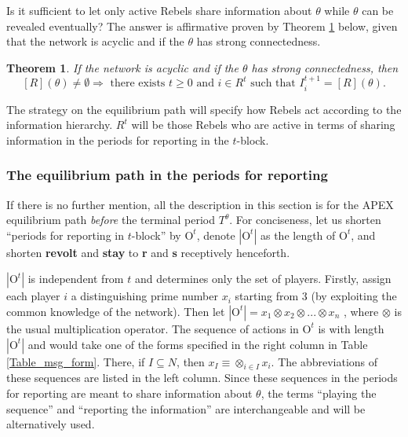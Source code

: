 \documentclass[12pt,letter]{article}
\newcommand{\Omicron}{\mathrm{O}}
\newtheorem{theorem}{Theorem}
\theoremstyle{definition}
\theoremstyle{remark}
\theoremstyle{claim}
\begin{document}
Is it sufficient to let only active Rebels share information about $\theta$ while $\theta$ can be revealed eventually? The answer is affirmative proven by Theorem \ref{lemma_empty} below, given that the network is acyclic and if the $\theta$ has strong connectedness.
\begin{theorem}
\label{lemma_empty}
If the network is acyclic and if the $\theta$ has strong connectedness, then 
\[[R](\theta)\neq \emptyset \Rightarrow \text{ there exists } t\geq 0 \text{ and } i\in R^t \text{ such that }I^{t+1}_i=[R](\theta).\] 
\end{theorem}


The strategy on the equilibrium path will specify how Rebels act according to the information hierarchy. $R^t$ will be those Rebels who are active in terms of sharing information in the periods for reporting in the $t$-block. 

\subsubsection{The equilibrium path in the periods for reporting}
\label{sec:eq_rp}
If there is no further mention, all the description in this section is for the APEX equilibrium path \textit{before} the terminal period $T^{\theta}$. For conciseness, let us shorten ``periods for reporting in $t$-block'' by $\Omicron^{t}$, denote $|\Omicron^t|$ as the length of $\Omicron^{t}$, and shorten \textbf{revolt} and \textbf{stay} to \textbf{r} and \textbf{s} receptively henceforth. 

$|\Omicron^{t}|$ is independent from $t$ and determines only the set of players. Firstly, assign each player $i$ a distinguishing prime number $x_i$ starting from $3$ (by exploiting the common knowledge of the network). Then let $|\Omicron^{t}|=x_1\otimes x_2\otimes...\otimes x_n$ , where $\otimes$ is the usual multiplication operator. The sequence of actions in $\Omicron^{t}$ is with length $|\Omicron^t|$ and would take one of the forms specified in the right column in Table \ref{Table_msg_form}. There, if $I\subseteq N$, then $x_{I}\equiv \otimes_{i\in I}x_i$. The abbreviations of these sequences are listed in the left column. Since these sequences in the periods for reporting are meant to share information about $\theta$, the terms ``playing the sequence'' and ``reporting the information'' are interchangeable and will be alternatively used.
\end{document}
